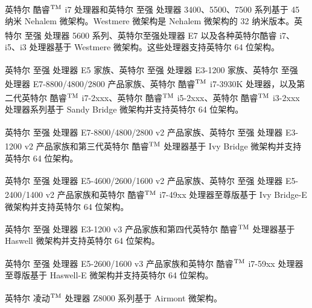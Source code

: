 \documentclass{article}
\begin{document}
英特尔\textsuperscript{\textregistered} 酷睿$^{\rm{TM}}$ i7 处理器和英特尔\textsuperscript{\textregistered} 至强\textsuperscript{\textregistered} 处理器 3400、5500、7500 系列基于 45 纳米 Nehalem 微架构。Westmere 微架构是 Nehalem 微架构的 32 纳米版本。英特尔\textsuperscript{\textregistered} 至强\textsuperscript{\textregistered} 处理器 5600 系列、英特尔至强处理器 E7 以及各种英特尔酷睿 i7、i5、i3 处理器基于 Westmere 微架构。这些处理器支持英特尔 64 位架构。

英特尔\textsuperscript{\textregistered} 至强\textsuperscript{\textregistered} 处理器 E5 家族、英特尔\textsuperscript{\textregistered} 至强\textsuperscript{\textregistered} 处理器 E3-1200 家族、英特尔\textsuperscript{\textregistered} 至强\textsuperscript{\textregistered} 处理器 E7-8800/4800/2800 产品家族、英特尔\textsuperscript{\textregistered} 酷睿$^{\rm{TM}}$ i7-3930K 处理器，以及第二代英特尔\textsuperscript{\textregistered} 酷睿$^{\rm{TM}}$ i7-2xxx、英特尔\textsuperscript{\textregistered} 酷睿$^{\rm{TM}}$ i5-2xxx、英特尔\textsuperscript{\textregistered} 酷睿$^{\rm{TM}}$ i3-2xxx 处理器系列基于 Sandy Bridge 微架构并支持英特尔 64 位架构。

英特尔\textsuperscript{\textregistered} 至强\textsuperscript{\textregistered} 处理器 E7-8800/4800/2800 v2 产品家族、英特尔\textsuperscript{\textregistered} 至强\textsuperscript{\textregistered} 处理器 E3-1200 v2 产品家族和第三代英特尔\textsuperscript{\textregistered} 酷睿$^{\rm{TM}}$ 处理器基于 Ivy Bridge 微架构并支持英特尔 64 位架构。

英特尔\textsuperscript{\textregistered} 至强\textsuperscript{\textregistered} 处理器 E5-4600/2600/1600 v2 产品家族、英特尔\textsuperscript{\textregistered} 至强\textsuperscript{\textregistered} 处理器 E5-2400/1400 v2 产品家族和英特尔\textsuperscript{\textregistered} 酷睿$^{\rm{TM}}$ i7-49xx 处理器至尊版基于 Ivy Bridge-E 微架构并支持英特尔 64 位架构。

英特尔\textsuperscript{\textregistered} 至强\textsuperscript{\textregistered} 处理器 E3-1200 v3 产品家族和第四代英特尔\textsuperscript{\textregistered} 酷睿$^{\rm{TM}}$ 处理器基于 Haswell 微架构并支持英特尔 64 位架构。

英特尔\textsuperscript{\textregistered} 至强\textsuperscript{\textregistered} 处理器 E5-2600/1600 v3 产品家族和英特尔\textsuperscript{\textregistered} 酷睿$^{\rm{TM}}$ i7-59xx 处理器至尊版基于 Haswell-E 微架构并支持英特尔 64 位架构。

英特尔\textsuperscript{\textregistered} 凌动$^{\rm{TM}}$ 处理器 Z8000 系列基于 Airmont 微架构。
\end{document}
